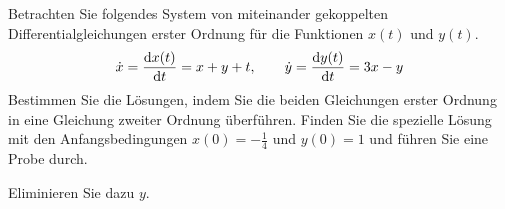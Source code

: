 \begin{atiTask}[
  title = Gekoppelte Differentialgleichungen
]
  Betrachten Sie folgendes System von miteinander gekoppelten Differentialgleichungen erster Ordnung für die Funktionen $x(t)$ und $y(t)$.
  \[
    \dot{x} = \frac{\mathrm{d} x(t)}{\mathrm{d} t} = x + y + t,\qquad \dot{y} = \frac{\mathrm{d} y(t)}{\mathrm{d} t} = 3x - y
  \]
  Bestimmen Sie die Lösungen, indem Sie die beiden Gleichungen erster Ordnung in eine Gleichung zweiter Ordnung überführen.
  Finden Sie die spezielle Lösung mit den Anfangsbedingungen $x(0)=-\frac{1}{4}$ und $y(0)=1$ und führen Sie eine Probe durch.

  \begin{atiNote}
    Eliminieren Sie dazu $y$.
  \end{atiNote}
\end{atiTask}